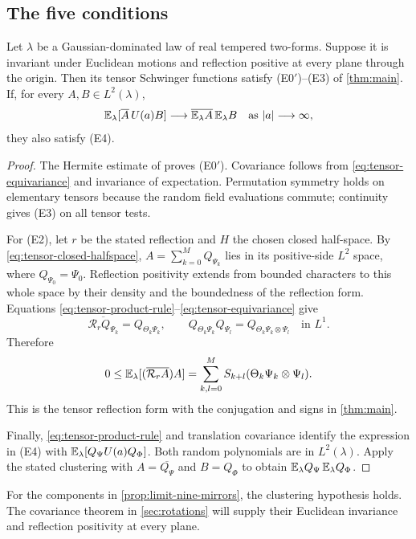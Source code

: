 \subsection{The five conditions}

\begin{proposition}\label{prop:tensor-OS}
Let $\lambda$ be a Gaussian-dominated law of real tempered two-forms.
Suppose it is invariant under Euclidean motions and reflection
positive at every plane through the origin. Then its tensor
Schwinger functions satisfy \textup{(E0$'$)}--\textup{(E3)} of
\cref{thm:main}. If, for every $A,B\in L^2(\lambda)$,
\[
 \mathbb E_\lambda[\overline A\,U(a)B]\longrightarrow
       \overline{\mathbb E_\lambda A}\,\mathbb E_\lambda B
       \quad\text{as }|a|\longrightarrow\infty,
\]
they also satisfy \textup{(E4)}.
\end{proposition}

\begin{proof}
The Hermite estimate of \cite[Proposition~6.1]{ContinuumLimits} proves \textup{(E0$'$)}. Covariance follows from
\eqref{eq:tensor-equivariance} and invariance of expectation.
Permutation symmetry holds on elementary tensors because the random
field evaluations commute; continuity gives \textup{(E3)} on all
tensor tests.

For \textup{(E2)}, let $r$ be the stated reflection and $H$ the
chosen closed half-space. By \eqref{eq:tensor-closed-halfspace},
$A=\sum_{k=0}^MQ_{\Psi_k}$ lies in its positive-side $L^2$ space,
where $Q_{\Psi_0}=\Psi_0$. Reflection positivity extends from
bounded characters to this whole space by their density and the
boundedness of the reflection form. Equations
\eqref{eq:tensor-product-rule}--\eqref{eq:tensor-equivariance} give
\[
 \overline{\mathcal R_rQ_{\Psi_k}}
       =Q_{\Theta_k\Psi_k},\qquad
 Q_{\Theta_k\Psi_k}Q_{\Psi_l}
       =Q_{\Theta_k\Psi_k\otimes\Psi_l}\quad\text{in }L^1.
\]
Therefore
\[
 0\le\mathbb E_\lambda[(\overline{\mathcal R_rA})A]
   =\sum_{k,l=0}^MS_{k+l}(\Theta_k\Psi_k\otimes\Psi_l).
\]
This is the tensor reflection form with the conjugation and signs
in \cref{thm:main}.

Finally, \eqref{eq:tensor-product-rule} and translation covariance
identify the expression in \textup{(E4)} with
$\mathbb E_\lambda[Q_\Psi U(a)Q_\Phi]$. Both random polynomials are in
$L^2(\lambda)$. Apply the stated clustering with
$A=\overline{Q_\Psi}$ and $B=Q_\Phi$ to obtain
$\mathbb E_\lambda Q_\Psi\,\mathbb E_\lambda Q_\Phi$.
\end{proof}

For the components in \cref{prop:limit-nine-mirrors}, the clustering
hypothesis holds. The covariance theorem in \cref{sec:rotations}
will supply their Euclidean invariance and reflection positivity
at every plane.


